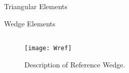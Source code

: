 \begin{frame}{Triangular Elements}
  \begin{figure}
    \centering
    \vspace{0.2in}
    \label{fig:triangle_elements}
  \end{figure}
\end{frame}

\begin{frame}{Wedge Elements}
  \begin{columns}
    \begin{column}{0.5\textwidth}
      \vspace*{\fill}
      \begin{figure}
        \centering
        \texttt{[image: Wref]}
        \caption{Description of Reference Wedge.}
        \label{fig:Wref}
      \end{figure}
      \vspace*{\fill}
    \end{column}
    \begin{column}{0.5\textwidth}
      \begin{figure}
        \centering
        \hspace{0.1\textwidth}
        \label{fig:sketch_wedge}
      \end{figure}
    \end{column}
  \end{columns}
\end{frame}

